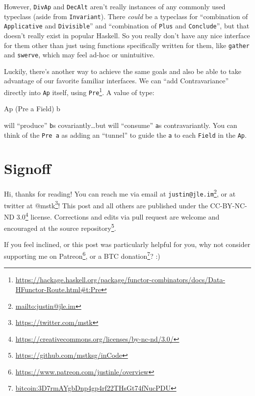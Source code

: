 \documentclass[]{article}
\newenvironment{Shaded}{}{}
\newcommand{\DataTypeTok}[1]{\textcolor[rgb]{0.56,0.13,0.00}{#1}}
\newcommand{\NormalTok}[1]{#1}
\renewcommand{\href}[2]{#2\footnote{\url{#1}}}
\begin{document}
However, \texttt{DivAp} and \texttt{DecAlt} aren't really instances of any
commonly used typeclass (aside from \texttt{Invariant}). There \emph{could} be a
typeclass for ``combination of \texttt{Applicative} and \texttt{Divisible}'' and
``combination of \texttt{Plus} and \texttt{Conclude}'', but that doesn't really
exist in popular Haskell. So you really don't have any nice interface for them
other than just using functions specifically written for them, like
\texttt{gather} and \texttt{swerve}, which may feel ad-hoc or unintuitive.

Luckily, there's another way to achieve the same goals and also be able to take
advantage of our favorite familiar interfaces. We can ``add Contravariance''
directly into \texttt{Ap} itself, using
\href{https://hackage.haskell.org/package/functor-combinators/docs/Data-HFunctor-Route.html\#t:Pre}{\texttt{Pre}}.
A value of type:

\begin{Shaded}
\begin{Highlighting}[]
\DataTypeTok{Ap}\NormalTok{ (}\DataTypeTok{Pre}\NormalTok{ a }\DataTypeTok{Field}\NormalTok{) b}
\end{Highlighting}
\end{Shaded}

will ``produce'' \texttt{b}s covariantly\ldots but will ``consume'' \texttt{a}s
contravariantly. You can think of the \texttt{Pre\ a} as adding an ``tunnel'' to
guide the \texttt{a} to each \texttt{Field} in the \texttt{Ap}.

\hypertarget{signoff}{%
\section{Signoff}\label{signoff}}

Hi, thanks for reading! You can reach me via email at
\href{mailto:justin@jle.im}{\nolinkurl{justin@jle.im}}, or at twitter at
\href{https://twitter.com/mstk}{@mstk}! This post and all others are published
under the \href{https://creativecommons.org/licenses/by-nc-nd/3.0/}{CC-BY-NC-ND
3.0} license. Corrections and edits via pull request are welcome and encouraged
at \href{https://github.com/mstksg/inCode}{the source repository}.

If you feel inclined, or this post was particularly helpful for you, why not
consider \href{https://www.patreon.com/justinle/overview}{supporting me on
Patreon}, or a \href{bitcoin:3D7rmAYgbDnp4gp4rf22THsGt74fNucPDU}{BTC donation}?
:)
\end{document}
